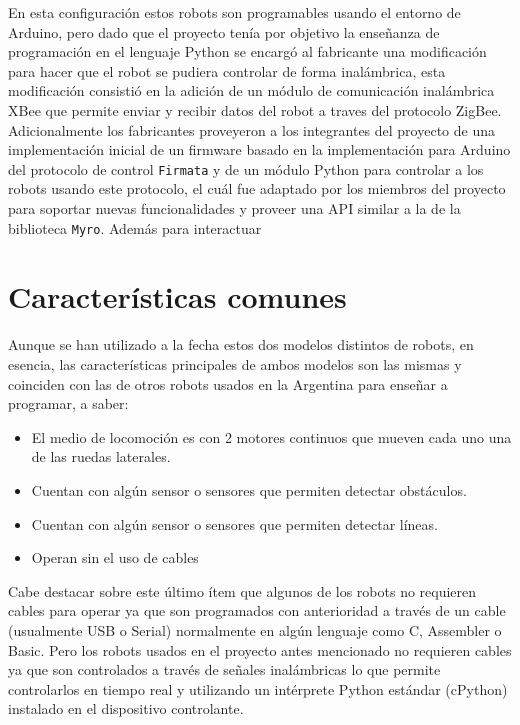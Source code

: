 En esta configuración estos robots son programables usando el entorno de
Arduino, pero dado que el proyecto tenía por objetivo la enseñanza de 
programación en el lenguaje Python se encargó al fabricante una modificación
para hacer que el robot se pudiera controlar de forma inalámbrica, esta
modificación consistió en la adición de un módulo de comunicación inalámbrica
XBee que permite enviar y recibir datos del robot a traves del protocolo
ZigBee. Adicionalmente los fabricantes proveyeron a los integrantes del
proyecto \proyecto{} de una implementación
inicial de un firmware basado en la implementación para Arduino del protocolo
de control \texttt{Firmata} y
de un módulo Python para controlar a los robots usando este protocolo, el
cuál fue adaptado por los miembros del proyecto \proyecto{}
para soportar nuevas funcionalidades y proveer una
API similar a la de la biblioteca \texttt{Myro}. Además para interactuar

\section{Características comunes}
Aunque se han utilizado a la fecha estos dos modelos distintos de robots,
en esencia, las características principales de ambos modelos son las mismas
y coinciden con las de otros robots usados en la Argentina para enseñar a
programar, a saber:
\begin{itemize}
    \item El medio de locomoción es con 2 motores continuos que mueven cada
        uno una de las ruedas laterales.
    \item Cuentan con algún sensor o sensores que permiten detectar obstáculos.
    \item Cuentan con algún sensor o sensores que permiten detectar líneas.
    \item Operan sin el uso de cables
\end{itemize}

Cabe destacar sobre este último ítem que algunos de los robots no requieren
cables para operar ya que son programados con anterioridad a través de un
cable (usualmente USB o Serial) normalmente en algún lenguaje como C, Assembler
o Basic. Pero los robots usados en el proyecto antes mencionado no requieren cables ya que son controlados a través de señales
inalámbricas lo que permite controlarlos en tiempo real y utilizando
un intérprete Python estándar (cPython) instalado en el dispositivo
controlante.

